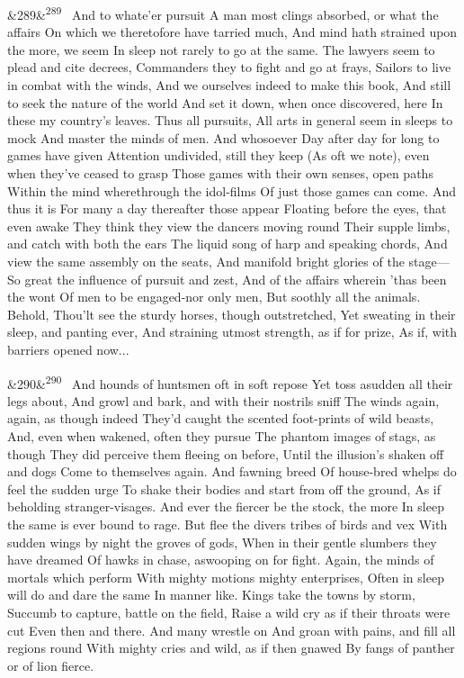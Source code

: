\documentclass[12pt]{article}
\newcommand{\para}[1][]{\par\noindent\ifx&#1&\else\textsuperscript{\footnotesize #1}~\fi}
\begin{document}
\para[289] And to whate'er pursuit A man most clings absorbed, or what the affairs On which we theretofore have tarried much, And mind hath strained upon the more, we seem In sleep not rarely to go at the same. The lawyers seem to plead and cite decrees, Commanders they to fight and go at frays, Sailors to live in combat with the winds, And we ourselves indeed to make this book, And still to seek the nature of the world And set it down, when once discovered, here In these my country's leaves. Thus all pursuits, All arts in general seem in sleeps to mock And master the minds of men. And whosoever Day after day for long to games have given Attention undivided, still they keep (As oft we note), even when they've ceased to grasp Those games with their own senses, open paths Within the mind wherethrough the idol-films Of just those games can come. And thus it is For many a day thereafter those appear Floating before the eyes, that even awake They think they view the dancers moving round Their supple limbs, and catch with both the ears The liquid song of harp and speaking chords, And view the same assembly on the seats, And manifold bright glories of the stage--- So great the influence of pursuit and zest, And of the affairs wherein 'thas been the wont Of men to be engaged-nor only men, But soothly all the animals. Behold, Thou'lt see the sturdy horses, though outstretched, Yet sweating in their sleep, and panting ever, And straining utmost strength, as if for prize, As if, with barriers opened now...

\para[290] And hounds of huntsmen oft in soft repose Yet toss asudden all their legs about, And growl and bark, and with their nostrils sniff The winds again, again, as though indeed They'd caught the scented foot-prints of wild beasts, And, even when wakened, often they pursue The phantom images of stags, as though They did perceive them fleeing on before, Until the illusion's shaken off and dogs Come to themselves again. And fawning breed Of house-bred whelps do feel the sudden urge To shake their bodies and start from off the ground, As if beholding stranger-visages. And ever the fiercer be the stock, the more In sleep the same is ever bound to rage. But flee the divers tribes of birds and vex With sudden wings by night the groves of gods, When in their gentle slumbers they have dreamed Of hawks in chase, aswooping on for fight. Again, the minds of mortals which perform With mighty motions mighty enterprises, Often in sleep will do and dare the same In manner like. Kings take the towns by storm, Succumb to capture, battle on the field, Raise a wild cry as if their throats were cut Even then and there. And many wrestle on And groan with pains, and fill all regions round With mighty cries and wild, as if then gnawed By fangs of panther or of lion fierce.
\end{document}
